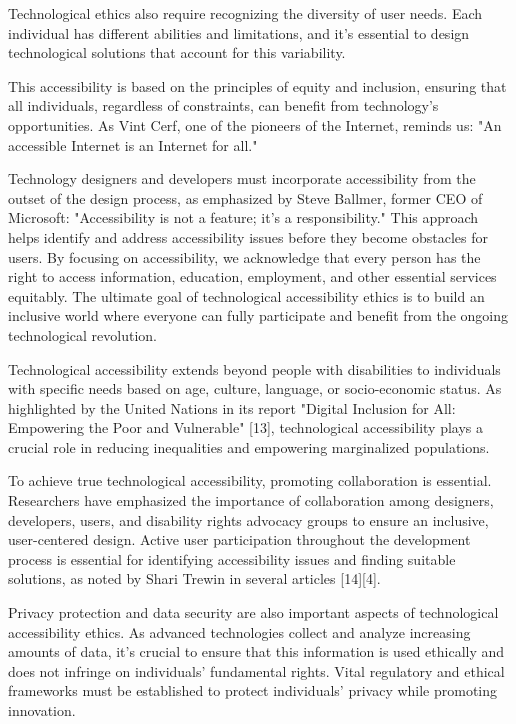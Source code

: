 Technological ethics also require recognizing the diversity of user needs. Each individual has different abilities and limitations, and it’s essential to design technological solutions that account for this variability.

This accessibility is based on the principles of equity and inclusion, ensuring that all individuals, regardless of constraints, can benefit from technology’s opportunities. As Vint Cerf, one of the pioneers of the Internet, reminds us: "An accessible Internet is an Internet for all."

Technology designers and developers must incorporate accessibility from the outset of the design process, as emphasized by Steve Ballmer, former CEO of Microsoft: "Accessibility is not a feature; it's a responsibility." This approach helps identify and address accessibility issues before they become obstacles for users. By focusing on accessibility, we acknowledge that every person has the right to access information, education, employment, and other essential services equitably. The ultimate goal of technological accessibility ethics is to build an inclusive world where everyone can fully participate and benefit from the ongoing technological revolution.

Technological accessibility extends beyond people with disabilities to individuals with specific needs based on age, culture, language, or socio-economic status. As highlighted by the United Nations in its report "Digital Inclusion for All: Empowering the Poor and Vulnerable" [13], technological accessibility plays a crucial role in reducing inequalities and empowering marginalized populations.

To achieve true technological accessibility, promoting collaboration is essential. Researchers have emphasized the importance of collaboration among designers, developers, users, and disability rights advocacy groups to ensure an inclusive, user-centered design. Active user participation throughout the development process is essential for identifying accessibility issues and finding suitable solutions, as noted by Shari Trewin in several articles [14][4].

Privacy protection and data security are also important aspects of technological accessibility ethics. As advanced technologies collect and analyze increasing amounts of data, it’s crucial to ensure that this information is used ethically and does not infringe on individuals' fundamental rights. Vital regulatory and ethical frameworks must be established to protect individuals' privacy while promoting innovation.

